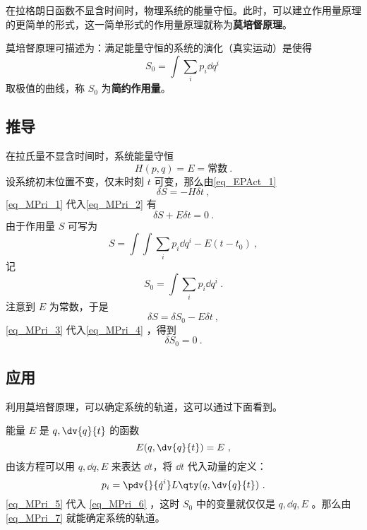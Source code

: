 在拉格朗日函数不显含时间时，物理系统的能量守恒。此时，可以建立作用量原理的更简单的形式，这一简单形式的作用量原理就称为\textbf{莫培督原理}。

莫培督原理可描述为：满足能量守恒的系统的演化（真实运动）是使得
\begin{equation}
S_0=\int\sum_i p_i\dd q^i~
\end{equation}
取极值的曲线，称 $S_0$ 为\textbf{简约作用量}。
\subsection{推导}
在拉氏量不显含时间时，系统能量守恒
\begin{equation}\label{eq_MPri_1}
H(p,q)=E=\text{常数}~.
\end{equation}
设系统初末位置不变，仅末时刻 $t$ 可变，那么由\autoref{eq_EPAct_1}~
\begin{equation}\label{eq_MPri_2}
\delta S=-H\delta t~,
\end{equation}
\autoref{eq_MPri_1} 代入\autoref{eq_MPri_2} 有
\begin{equation}\label{eq_MPri_4}
\delta S+E\delta t=0~.
\end{equation}
由于作用量 $S$ 可写为
\begin{equation}
S=\int \int\sum_i p_i\dd q^i-E(t-t_0)~,
\end{equation}
记
\begin{equation}\label{eq_MPri_6}
S_0=\int\sum_i p_i\dd q^i~.
\end{equation}
注意到 $E$ 为常数，于是
\begin{equation}\label{eq_MPri_3}
\delta S=\delta S_0-E\delta t~,
\end{equation}
\autoref{eq_MPri_3} 代入\autoref{eq_MPri_4} ，得到
\begin{equation}\label{eq_MPri_7}
\delta S_0=0~.
\end{equation}
\subsection{应用}
利用莫培督原理，可以确定系统的轨道，这可以通过下面看到。

能量 $E$ 是 $q,\dv{q}{t}$ 的函数 
\begin{equation}
E(q,\dv{q}{t})=E~,
\end{equation}
由该方程可以用 $q,\dd q,E$ 来表达 $\dd t$，将 $\dd t$ 代入动量的定义：
\begin{equation}\label{eq_MPri_5}
p_i=\pdv{}{\dot q^i}L\qty(q,\dv{q}{t})~.
\end{equation}
\autoref{eq_MPri_5} 代入 \autoref{eq_MPri_6} ，这时 $S_0$ 中的变量就仅仅是 $q,\dd q, E$ 。那么由\autoref{eq_MPri_7} 就能确定系统的轨道。